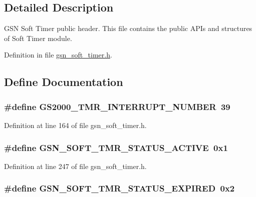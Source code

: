\subsection{Detailed Description}
GSN Soft Timer public header. This file contains the public APIs and structures of Soft Timer module. 

Definition in file \hyperlink{a00586_source}{gsn\_\-soft\_\-timer.h}.



\subsection{Define Documentation}
\hypertarget{a00586_a5e020cc782064f4e8b7ba19f9380a484}{
\subsubsection[{GS2000\_\-TMR\_\-INTERRUPT\_\-NUMBER}]{\setlength{\rightskip}{0pt plus 5cm}\#define GS2000\_\-TMR\_\-INTERRUPT\_\-NUMBER~39}}
\label{a00586_a5e020cc782064f4e8b7ba19f9380a484}


Definition at line 164 of file gsn\_\-soft\_\-timer.h.

\hypertarget{a00586_a79c23fe59c4cb256b6e65e15f15f992a}{
\subsubsection[{GSN\_\-SOFT\_\-TMR\_\-STATUS\_\-ACTIVE}]{\setlength{\rightskip}{0pt plus 5cm}\#define GSN\_\-SOFT\_\-TMR\_\-STATUS\_\-ACTIVE~0x1}}
\label{a00586_a79c23fe59c4cb256b6e65e15f15f992a}


Definition at line 247 of file gsn\_\-soft\_\-timer.h.

\hypertarget{a00586_aa5620f9cd5903b3dba9f6e7dd428b702}{
\subsubsection[{GSN\_\-SOFT\_\-TMR\_\-STATUS\_\-EXPIRED}]{\setlength{\rightskip}{0pt plus 5cm}\#define GSN\_\-SOFT\_\-TMR\_\-STATUS\_\-EXPIRED~0x2}}
\label{a00586_aa5620f9cd5903b3dba9f6e7dd428b702}


